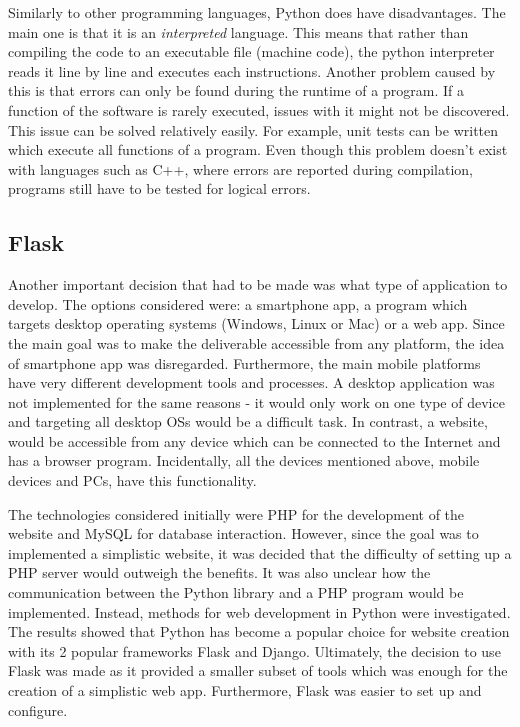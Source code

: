 \documentclass[12pt,a4paper]{article}
\begin{document}
Similarly to other programming languages, Python does have disadvantages. The main one is that it is an \textit{interpreted} language. This means that rather than compiling the code to an executable file (machine code), the python interpreter reads it line by line and executes each instructions. Another problem caused by this is that errors can only be found during the runtime of a program. If a function of the software is rarely executed, issues with it might not be discovered. This issue can be solved relatively easily. For example, unit tests can be written which execute all functions of a program. Even though this problem doesn't exist with languages such as C++, where errors are reported during compilation, programs still have to be tested for logical errors.

\subsection{Flask}
Another important decision that had to be made was what type of application to develop. The options considered were: a smartphone app, a program which targets desktop operating systems (Windows, Linux or Mac) or a web app. Since the main goal was to make the deliverable accessible from any platform, the idea of smartphone app was disregarded. Furthermore, the main mobile platforms have very different development tools and processes. A desktop application was not implemented for the same reasons - it would only work on one type of device and targeting all desktop OSs would be a difficult task. In contrast, a website, would be accessible from any device which can be connected to the Internet and has a browser program. Incidentally, all the devices mentioned above, mobile devices and PCs, have this functionality.

The technologies considered initially were PHP for the development of the website and MySQL for database interaction. However, since the goal was to implemented a simplistic website, it was decided that the difficulty of setting up a PHP server would outweigh the benefits. It was also unclear how the communication between the Python library and a PHP program would be implemented. Instead, methods for web development in Python were investigated. The results showed that Python has become a popular choice for website creation with its 2 popular frameworks Flask and Django. Ultimately, the decision to use Flask was made as it provided a smaller subset of tools which was enough for the creation of a simplistic web app. Furthermore, Flask was easier to set up and configure.  
\end{document}
